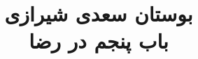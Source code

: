 \documentclass[14pt,b5paper]{article}
\begin{document}
\title{\Huge بوستان سعدی شیرازی \\
باب پنجم در رضا}
\author{ }
\date{ }
\maketitle
\newpage
\tableofcontents
\newpage

\newpage

\newpage

\newpage

\newpage

\newpage

\newpage

\newpage

\newpage

\newpage

\newpage

\newpage

\newpage

\newpage

\newpage

\newpage
\end{document}
